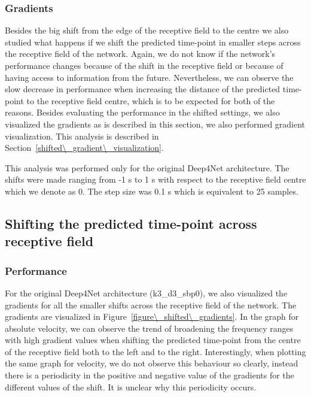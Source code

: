 \subsubsection{Gradients}
Besides the big shift from the edge of the receptive field to the centre we also studied what happens if we shift the predicted time-point in smaller steps across the receptive field of the network.
Again, we do not know if the network's performance changes because of the shift in the receptive field or because of having access to information from the future.
Nevertheless, we can observe the slow decrease in performance when increasing the distance of the predicted time-point to the receptive field centre, which is to be expected for both of the reasons.
Besides evaluating the performance in the shifted settings, we also visualized the gradients as is described in this section, we also performed gradient visualization.
This analysis is described in Section~\ref{shifted\_gradient\_visualization}.

This analysis was performed only for the original Deep4Net architecture.
The shifts were made ranging from  -1 s  to 1 s with respect to the receptive field centre which we denote as 0.
The step size was 0.1 s which is equivalent to 25 samples.

\subsection{Shifting the predicted time-point across receptive field}\label{subsec:shifting-the-predicted-time-point-across-receptive-field}
\subsubsection{Performance}
For the original Deep4Net architecture (k3\_d3\_sbp0), we also visualized the gradients for all the smaller shifts across the receptive field of the network.
The gradients are visualized in Figure~\ref{figure\_shifted\_gradients}.
In the graph for absolute velocity, we can observe the trend of broadening the frequency ranges with high gradient values when shifting the predicted time-point from the centre of the receptive field both to the left and to the right.
Interestingly, when plotting the same graph for velocity, we do not observe this behaviour so clearly, instead there is a periodicity in the positive and negative value of the gradients for the different values of the shift.
It is unclear why this periodicity occurs.
